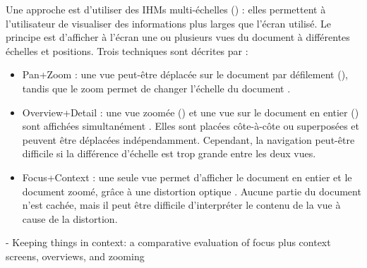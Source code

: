 Une approche est d'utiliser des IHMs multi-échelles () : elles permettent à l'utilisateur de visualiser des informations plus larges que l'écran utilisé. Le principe est d'afficher à l'écran une ou plusieurs vues du document à différentes échelles et positions. Trois techniques sont décrites par \cite{Guiard2004} :
\begin{itemize}
  \item Pan+Zoom : une vue peut-être déplacée sur le document par défilement (), tandis que le zoom permet de changer l'échelle du document .
  \item Overview+Detail : une vue zoomée () et une vue sur le document en entier () sont affichées simultanément . Elles sont placées côte-à-côte ou superposées et peuvent être déplacées indépendamment. Cependant, la navigation peut-être difficile si la différence d'échelle est trop grande entre les deux vues.
  \item Focus+Context : une seule vue permet d'afficher le document en entier et le document zoomé, grâce à une distortion optique . Aucune partie du document n'est cachée, mais il peut être difficile d'interpréter le contenu de la vue à cause de la distortion.
\end{itemize}
\medskip


\cite{Baudisch2002} - Keeping things in context: a comparative evaluation of focus plus context screens, overviews, and zooming


